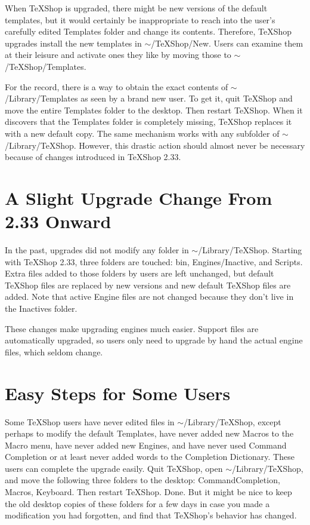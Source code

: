 \documentclass[11pt, oneside]{amsart}
\begin{document}
When TeXShop is upgraded, there might be new versions of the default templates, but it would certainly be inappropriate to reach into the user's carefully edited Templates folder and change its contents. Therefore, TeXShop upgrades install the new templates in $\sim$/TeXShop/New.  Users can examine them at their leisure and activate ones they like by moving those to $\sim$/TeXShop/Templates.

For the record, there is a way to obtain the exact contents of $\sim$/Library/Templates as seen by a brand new user.  To get it, quit TeXShop and move the entire Templates folder to the desktop. Then restart TeXShop. When it discovers that the Templates folder is completely missing, TeXShop replaces it with a new default copy. The same mechanism works with any subfolder of $\sim$/Library/TeXShop. However, this drastic action should almost never be necessary because of changes introduced in TeXShop 2.33.

\section{A Slight Upgrade Change From 2.33 Onward}

In the past, upgrades did not modify any folder in $\sim$/Library/TeXShop. Starting with TeXShop 2.33, three folders are touched:  bin, Engines/Inactive, and Scripts. Extra files added to those folders by users are left unchanged, but default TeXShop files are replaced by new versions and new default TeXShop files are added. Note that active Engine files are not changed because they don't live in the Inactives folder.

These changes make upgrading engines much easier. Support files are automatically upgraded, so users only need to upgrade by hand  the actual engine files, which seldom change.

\section{Easy Steps for Some Users}

Some TeXShop users have never edited files in $\sim$/Library/TeXShop, except perhaps to modify the default Templates, have never added new Macros to the Macro menu, have never added  new Engines, and  have never used Command Completion or at least never added words to the Completion Dictionary.
These users can complete the upgrade easily. Quit TeXShop, open $\sim$/Library/TeXShop, and move the following three folders to the desktop:
CommandCompletion, Macros, Keyboard. Then restart TeXShop. Done. But it might be nice to keep the old desktop copies of these folders for a few days in case you made a modification you had forgotten, and find that TeXShop's behavior has changed.
\end{document}
